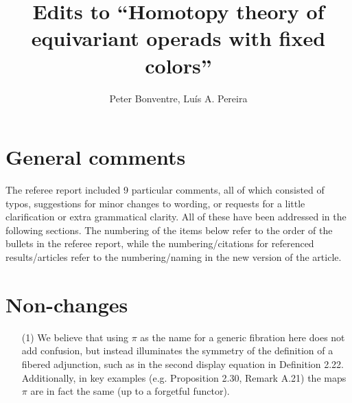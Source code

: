 \documentclass[a4paper,10pt
]{article}%
\title{Edits to ``Homotopy theory of equivariant operads with fixed colors''}
\author{Peter Bonventre, Lu\'is A. Pereira}%
\numberwithin{equation}{section}
\numberwithin{figure}{section}
\theoremstyle{definition} %
\newcommand{\1}{\ensuremath{\mathbbm 1}}%
\begin{document}
 
  
\maketitle
 



\section{General comments}

The referee report included 9 particular comments,
all of which consisted of
typos,
suggestions for minor changes to wording,
or requests for a little clarification or extra grammatical clarity.
All of these have been addressed in the following sections.
The numbering of the items below refer to the order of the bullets in the referee report,
while the numbering/citations for referenced results/articles refer to the numbering/naming in the new version of the article.

\section*{Non-changes}
      
\begin{enumerate}
\item[(1)] We believe that using $\pi$ as the name for a generic fibration here does not add confusion, but instead illuminates the symmetry of the definition of a fibered adjunction, such as in the second display equation in Definition 2.22.
        Additionally, in key examples (e.g. Proposition 2.30, Remark A.21)
        the maps $\pi$ are in fact the same (up to a forgetful functor).
\end{enumerate}
\end{document}
